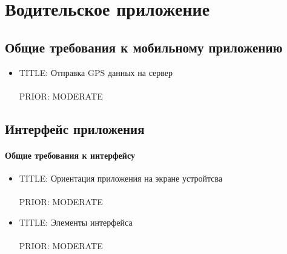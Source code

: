 \section{Водительское приложение}


  \subsection{Общие требования к мобильному приложению}

    \begin{itemize}

      \item{
        TITLE: Отправка GPS данных на сервер\\
        \\
        PRIOR: MODERATE\\}

    \end{itemize}

  \subsection{Интерфейс приложения}
   
      \paragraph{Общие требования к интерфейсу}
      \begin{itemize}

        \item{
          TITLE: Ориентация приложения на экране устройтсва\\
          \\
          PRIOR: MODERATE\\}

        \item{
          TITLE: Элементы интерфейса\\
          \\
          PRIOR: MODERATE\\}

      \end{itemize}

